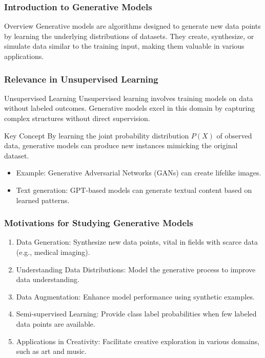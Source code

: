 \documentclass[aspectratio=169]{beamer}
\begin{document}
\frame{\titlepage}

\begin{frame}[fragile]
    \frametitle{Introduction to Generative Models}
    \begin{block}{Overview}
        Generative models are algorithms designed to generate new data points by learning the underlying distributions of datasets. They create, synthesize, or simulate data similar to the training input, making them valuable in various applications.
    \end{block}
\end{frame}

\begin{frame}[fragile]
    \frametitle{Relevance in Unsupervised Learning}
    \begin{block}{Unsupervised Learning}
        Unsupervised learning involves training models on data without labeled outcomes. Generative models excel in this domain by capturing complex structures without direct supervision.
    \end{block}
    \begin{block}{Key Concept}
        By learning the joint probability distribution \( P(X) \) of observed data, generative models can produce new instances mimicking the original dataset.
    \end{block}
    \begin{itemize}
        \item Example:  
        Generative Adversarial Networks (GANs) can create lifelike images.
        \item Text generation: GPT-based models can generate textual content based on learned patterns.
    \end{itemize}
\end{frame}

\begin{frame}[fragile]
    \frametitle{Motivations for Studying Generative Models}
    \begin{enumerate}
        \item Data Generation: Synthesize new data points, vital in fields with scarce data (e.g., medical imaging).
        \item Understanding Data Distributions: Model the generative process to improve data understanding.
        \item Data Augmentation: Enhance model performance using synthetic examples.
        \item Semi-supervised Learning: Provide class label probabilities when few labeled data points are available.
        \item Applications in Creativity: Facilitate creative exploration in various domains, such as art and music.
    \end{enumerate}
\end{frame}
\end{document}
